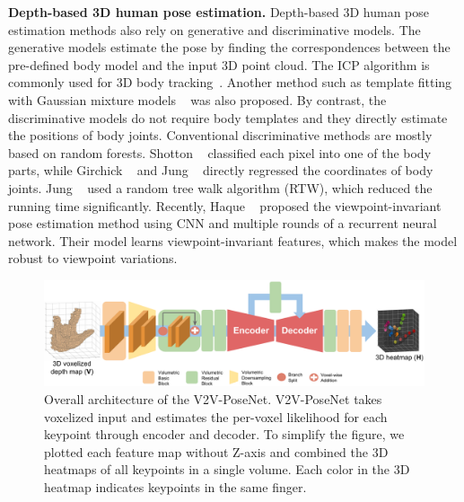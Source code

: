 {\bf Depth-based 3D human pose estimation.} 
Depth-based 3D human pose estimation methods also rely on generative and discriminative models. The generative models estimate the pose by finding the correspondences between the pre-defined body model and the input 3D point cloud. The ICP algorithm is commonly used for 3D body tracking~\cite{ganapathi2012real,grest2005nonlinear,knoop2006sensor,helten2013personalization}. Another method such as template fitting with Gaussian mixture models ~\cite{ye2014real} was also proposed. By contrast, the discriminative models do not require body templates and they directly estimate the positions of body joints. Conventional discriminative methods are mostly based on random forests. Shotton \etal~\cite{shotton2013real} classified each pixel into one of the body parts, while Girchick \etal~\cite{girshick2011efficient} and Jung \etal~\cite{jung2016sequential} directly regressed the coordinates of body joints. Jung \etal~\cite{yub2015random} used a random tree walk algorithm (RTW), which reduced the running time significantly. Recently, Haque \etal~\cite{haque2016towards} proposed the viewpoint-invariant pose estimation method using CNN and multiple rounds of a recurrent neural network. Their model learns viewpoint-invariant features, which makes the model robust to viewpoint variations.

\begin{figure}
\begin{center}
\includegraphics[width=1.0\linewidth]{model_architecture.pdf}
\end{center}
\vspace*{-5mm}
   \caption{Overall architecture of the V2V-PoseNet. V2V-PoseNet takes voxelized input and estimates the per-voxel likelihood for each keypoint through encoder and decoder. To simplify the figure, we plotted each feature map without Z-axis and combined the 3D heatmaps of all keypoints in a single volume. Each color in the 3D heatmap indicates keypoints in the same finger.}
\vspace*{-3mm}
\label{fig:model_architecture}
\end{figure}

